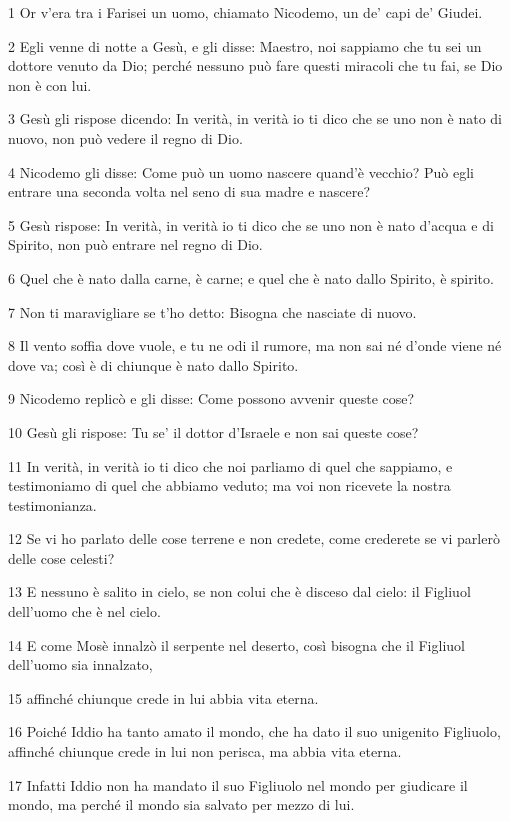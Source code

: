 \par 1 Or v'era tra i Farisei un uomo, chiamato Nicodemo, un de' capi de' Giudei.
\par 2 Egli venne di notte a Gesù, e gli disse: Maestro, noi sappiamo che tu sei un dottore venuto da Dio; perché nessuno può fare questi miracoli che tu fai, se Dio non è con lui.
\par 3 Gesù gli rispose dicendo: In verità, in verità io ti dico che se uno non è nato di nuovo, non può vedere il regno di Dio.
\par 4 Nicodemo gli disse: Come può un uomo nascere quand'è vecchio? Può egli entrare una seconda volta nel seno di sua madre e nascere?
\par 5 Gesù rispose: In verità, in verità io ti dico che se uno non è nato d'acqua e di Spirito, non può entrare nel regno di Dio.
\par 6 Quel che è nato dalla carne, è carne; e quel che è nato dallo Spirito, è spirito.
\par 7 Non ti maravigliare se t'ho detto: Bisogna che nasciate di nuovo.
\par 8 Il vento soffia dove vuole, e tu ne odi il rumore, ma non sai né d'onde viene né dove va; così è di chiunque è nato dallo Spirito.
\par 9 Nicodemo replicò e gli disse: Come possono avvenir queste cose?
\par 10 Gesù gli rispose: Tu se' il dottor d'Israele e non sai queste cose?
\par 11 In verità, in verità io ti dico che noi parliamo di quel che sappiamo, e testimoniamo di quel che abbiamo veduto; ma voi non ricevete la nostra testimonianza.
\par 12 Se vi ho parlato delle cose terrene e non credete, come crederete se vi parlerò delle cose celesti?
\par 13 E nessuno è salito in cielo, se non colui che è disceso dal cielo: il Figliuol dell'uomo che è nel cielo.
\par 14 E come Mosè innalzò il serpente nel deserto, così bisogna che il Figliuol dell'uomo sia innalzato,
\par 15 affinché chiunque crede in lui abbia vita eterna.
\par 16 Poiché Iddio ha tanto amato il mondo, che ha dato il suo unigenito Figliuolo, affinché chiunque crede in lui non perisca, ma abbia vita eterna.
\par 17 Infatti Iddio non ha mandato il suo Figliuolo nel mondo per giudicare il mondo, ma perché il mondo sia salvato per mezzo di lui.
